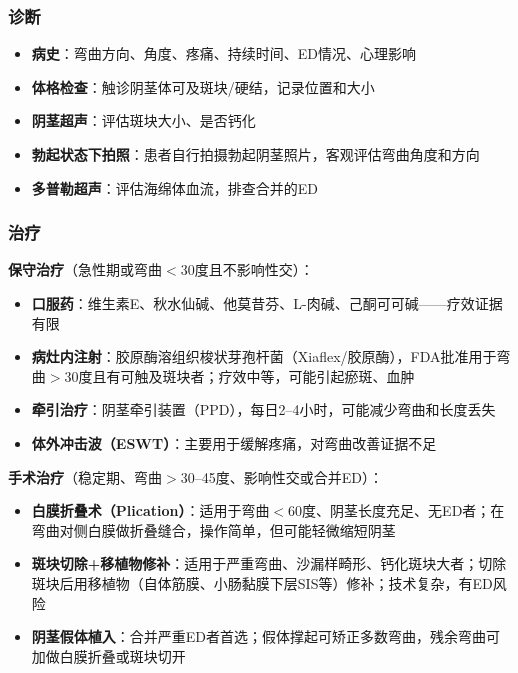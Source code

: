 \documentclass[12pt,a4paper,twoside]{ctexbook}
\begin{document}
\subsubsection{诊断}

\begin{itemize}[leftmargin=2cm]
	\item \textbf{病史}：弯曲方向、角度、疼痛、持续时间、ED情况、心理影响
	\item \textbf{体格检查}：触诊阴茎体可及斑块/硬结，记录位置和大小
	\item \textbf{阴茎超声}：评估斑块大小、是否钙化
	\item \textbf{勃起状态下拍照}：患者自行拍摄勃起阴茎照片，客观评估弯曲角度和方向
	\item \textbf{多普勒超声}：评估海绵体血流，排查合并的ED
\end{itemize}

\subsubsection{治疗}

\textbf{保守治疗}（急性期或弯曲$<$30度且不影响性交）：
\begin{itemize}[leftmargin=2cm]
	\item \textbf{口服药}：维生素E、秋水仙碱、他莫昔芬、L-肉碱、己酮可可碱——疗效证据有限
	\item \textbf{病灶内注射}：胶原酶溶组织梭状芽孢杆菌（Xiaflex/胶原酶），FDA批准用于弯曲$>$30度且有可触及斑块者；疗效中等，可能引起瘀斑、血肿
	\item \textbf{牵引治疗}：阴茎牵引装置（PPD），每日2--4小时，可能减少弯曲和长度丢失
	\item \textbf{体外冲击波（ESWT）}：主要用于缓解疼痛，对弯曲改善证据不足
\end{itemize}

\textbf{手术治疗}（稳定期、弯曲$>$30--45度、影响性交或合并ED）：
\begin{itemize}[leftmargin=2cm]
	\item \textbf{白膜折叠术（Plication）}：适用于弯曲$<$60度、阴茎长度充足、无ED者；在弯曲对侧白膜做折叠缝合，操作简单，但可能轻微缩短阴茎
	\item \textbf{斑块切除+移植物修补}：适用于严重弯曲、沙漏样畸形、钙化斑块大者；切除斑块后用移植物（自体筋膜、小肠黏膜下层SIS等）修补；技术复杂，有ED风险
	\item \textbf{阴茎假体植入}：合并严重ED者首选；假体撑起可矫正多数弯曲，残余弯曲可加做白膜折叠或斑块切开
\end{itemize}
\end{document}
